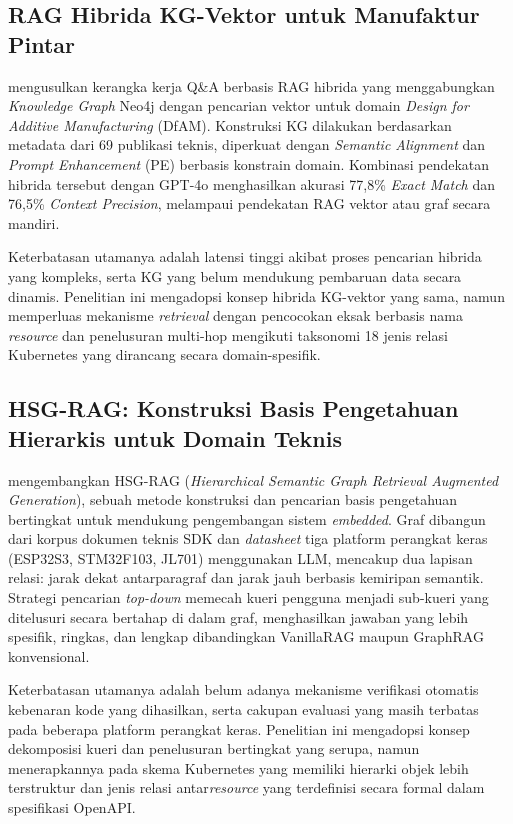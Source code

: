 \subsection{RAG Hibrida KG-Vektor untuk Manufaktur Pintar}

\textcite{wan2025empowering} mengusulkan kerangka kerja Q\&A berbasis RAG hibrida yang menggabungkan \textit{Knowledge Graph} Neo4j dengan pencarian vektor untuk domain \textit{Design for Additive Manufacturing} (DfAM). Konstruksi KG dilakukan berdasarkan metadata dari 69 publikasi teknis, diperkuat dengan \textit{Semantic Alignment} dan \textit{Prompt Enhancement} (PE) berbasis konstrain domain. Kombinasi pendekatan hibrida tersebut dengan GPT-4o menghasilkan akurasi 77,8\% \textit{Exact Match} dan 76,5\% \textit{Context Precision}, melampaui pendekatan RAG vektor atau graf secara mandiri.

Keterbatasan utamanya adalah latensi tinggi akibat proses pencarian hibrida yang kompleks, serta KG yang belum mendukung pembaruan data secara dinamis. Penelitian ini mengadopsi konsep hibrida KG-vektor yang sama, namun memperluas mekanisme \textit{retrieval} dengan pencocokan eksak berbasis nama \textit{resource} dan penelusuran multi-hop mengikuti taksonomi 18 jenis relasi Kubernetes yang dirancang secara domain-spesifik.

\subsection{HSG-RAG: Konstruksi Basis Pengetahuan Hierarkis untuk Domain Teknis}

\textcite{hsgrag2025acm} mengembangkan HSG-RAG (\textit{Hierarchical Semantic Graph Retrieval Augmented Generation}), sebuah metode konstruksi dan pencarian basis pengetahuan bertingkat untuk mendukung pengembangan sistem \textit{embedded}. Graf dibangun dari korpus dokumen teknis SDK dan \textit{datasheet} tiga platform perangkat keras (ESP32S3, STM32F103, JL701) menggunakan LLM, mencakup dua lapisan relasi: jarak dekat antarparagraf dan jarak jauh berbasis kemiripan semantik. Strategi pencarian \textit{top-down} memecah kueri pengguna menjadi sub-kueri yang ditelusuri secara bertahap di dalam graf, menghasilkan jawaban yang lebih spesifik, ringkas, dan lengkap dibandingkan VanillaRAG maupun GraphRAG konvensional.

Keterbatasan utamanya adalah belum adanya mekanisme verifikasi otomatis kebenaran kode yang dihasilkan, serta cakupan evaluasi yang masih terbatas pada beberapa platform perangkat keras. Penelitian ini mengadopsi konsep dekomposisi kueri dan penelusuran bertingkat yang serupa, namun menerapkannya pada skema Kubernetes yang memiliki hierarki objek lebih terstruktur dan jenis relasi antar\textit{resource} yang terdefinisi secara formal dalam spesifikasi OpenAPI.


